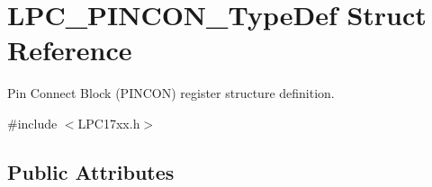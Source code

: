 \hypertarget{struct_l_p_c___p_i_n_c_o_n___type_def}{\section{\-L\-P\-C\-\_\-\-P\-I\-N\-C\-O\-N\-\_\-\-Type\-Def \-Struct \-Reference}
\label{struct_l_p_c___p_i_n_c_o_n___type_def}
}


\-Pin \-Connect \-Block (\-P\-I\-N\-C\-O\-N) register structure definition.  




{\ttfamily \#include $<$\-L\-P\-C17xx.\-h$>$}

\subsection*{\-Public \-Attributes}
